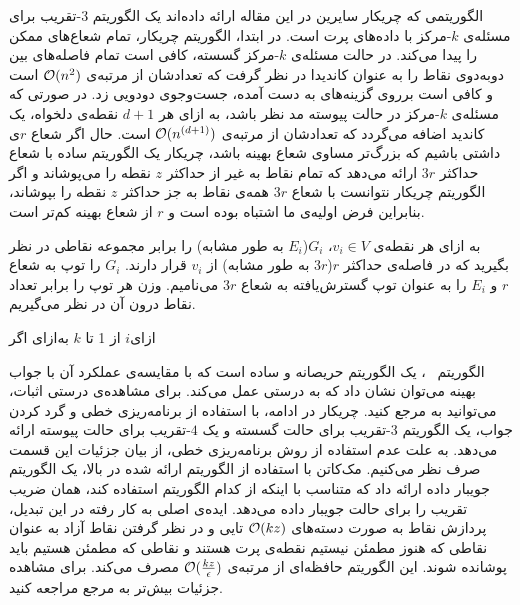 
الگوریتمی که چریکار سایرین در این مقاله ارائه داده‌اند یک الگوریتم $3$-تقریب برای مسئله‌ی $k$-مرکز با داده‌های پرت است.
در ابتدا، الگوریتم چریکار، تمام شعاع‌های ممکن را پیدا می‌کند.
در حالت مسئله‌ی $k$-مرکز گسسته، کافی است تمام فاصله‌های بین دوبه‌دوی نقاط را به عنوان کاندیدا در نظر گرفت که تعدادشان از مرتبه‌ی $\mathcal{O}(n^2)$ است و کافی است برروی گزینه‌های به دست آمده، جست‌وجوی دودویی زد.
در صورتی که مسئله‌ی $k$-مرکز در حالت پیوسته مد نظر باشد، به ازای هر $d+1$ نقطه‌ی دلخواه، یک کاندید اضافه می‌گردد که تعدادشان از مرتبه‌ی $\mathcal{O}(n^{(d+1)})$ است.
حال اگر شعاع $r$ی داشتی باشیم که بزرگ‌تر مساوی شعاع بهینه باشد، چریکار یک الگوریتم ساده با شعاع حداکثر $3r$ ارائه می‌دهد که تمام نقاط به غیر از حداکثر $z$ نقطه را می‌پوشاند و اگر الگوریتم چریکار نتوانست با شعاع $3r$ همه‌ی نقاط به جز حداکثر $z$ نقطه را بپوشاند، بنابراین فرض اولیه‌ی ما اشتباه بوده است و $r$ از شعاع بهینه کم‌تر است.


به ازای هر نقطه‌ی $v_i \in V$، $G_i$($E_i$ به طور مشابه) را برابر مجموعه نقاطی در نظر بگیرید که در فاصله‌ی حداکثر $r$($3r$ به طور مشابه) از $v_i$ قرار دارند. $G_i$ را توپ به شعاع $r$ و $E_i$ را به عنوان توپ گسترش‌یافته به شعاع $3r$ می‌نامیم.
وزن هر توپ را برابر تعداد نقاط درون آن در نظر می‌گیریم.


‌ازای{$i$ از 1 تا $k$}
‌به‌ازای
‌اگر

الگوریتم ~، یک الگوریتم حریصانه و ساده است که با مقایسه‌ی عملکرد آن با جواب بهینه می‌توان نشان داد که به درستی عمل می‌کند.
برای مشاهده‌ی درستی اثبات، می‌توانید به مرجع   کنید.
چریکار در ادامه، با استفاده از برنامه‌ریزی خطی و گرد کردن جواب، یک الگوریتم $3$-تقریب برای حالت گسسته و یک $4$-تقریب برای حالت پیوسته ارائه می‌دهد.
به علت عدم استفاده از روش برنامه‌ریزی خطی، از بیان جزئیات این قسمت صرف نظر می‌کنیم.
مک‌کاتن با استفاده از الگوریتم ارائه شده در بالا، یک الگوریتم جویبار داده ارائه داد که متناسب با اینکه از کدام الگوریتم استفاده کند، همان ضریب تقریب را  برای حالت جویبار داده می‌دهد.
ایده‌ی اصلی به‌ کار رفته در این تبدیل، پردازش نقاط به صورت دسته‌های $\mathcal{O}(kz)$ تایی و در نظر گرفتن نقاط آزاد به عنوان نقاطی که هنوز مطمئن نیستیم نقطه‌ی پرت هستند و نقاطی که مطمئن هستیم باید پوشانده شوند.
این الگوریتم حافظه‌ای از مرتبه‌ی $\mathcal{O}(\frac{kz}{\epsilon})$ مصرف می‌کند.
برای مشاهده جزئیات بیش‌تر به مرجع  مراجعه کنید.

